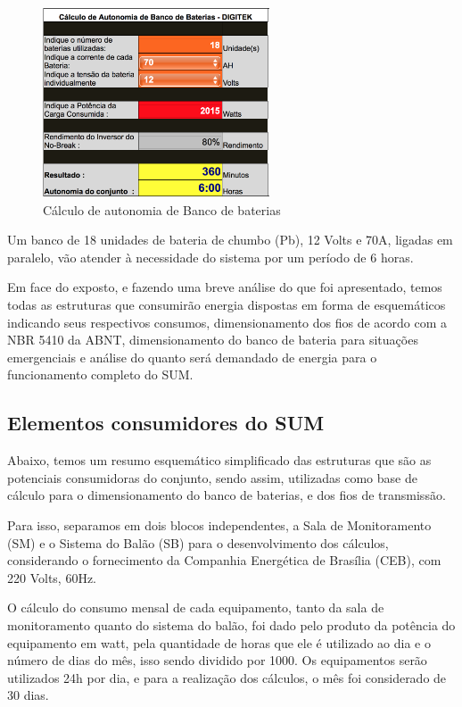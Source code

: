 \begin{figure}[H]
	\centering
	\includegraphics[width=0.6\textwidth]{figuras/calculo}
	\caption[Cálculo de autonomia de Banco de baterias]{Cálculo de autonomia de Banco de baterias~\cite{digitek}}
	\label{img:calculo}
\end{figure}


Um banco de 18 unidades de bateria de chumbo (Pb), 12 Volts e 70A, ligadas em paralelo, vão atender à necessidade do sistema por um período de 6 horas.

Em face do exposto, e fazendo uma breve análise do que foi apresentado, temos todas as estruturas que consumirão energia dispostas em forma de esquemáticos indicando seus respectivos consumos, dimensionamento dos fios de acordo com a NBR 5410 da ABNT, dimensionamento do banco de bateria para situações emergenciais e análise do quanto será demandado de energia para o funcionamento completo do SUM.

\subsection{Elementos consumidores do SUM}

Abaixo, temos um resumo esquemático simplificado das estruturas que são as potenciais consumidoras do conjunto, sendo assim, utilizadas como base de cálculo para o dimensionamento do banco de baterias, e dos fios de transmissão.

Para isso, separamos em dois blocos independentes, a Sala de Monitoramento (SM) e o Sistema do Balão (SB)  para o desenvolvimento dos cálculos, considerando o fornecimento da Companhia Energética de Brasília (CEB), com 220 Volts, 60Hz.~\cite{ceb}

O cálculo do consumo mensal de cada equipamento, tanto da sala de monitoramento quanto do sistema do balão, foi dado pelo produto da potência do equipamento em watt, pela quantidade de horas que ele é utilizado ao dia e o número de dias do mês, isso sendo dividido por 1000. Os equipamentos serão utilizados 24h por dia, e para a realização dos cálculos, o mês foi considerado de 30 dias.

